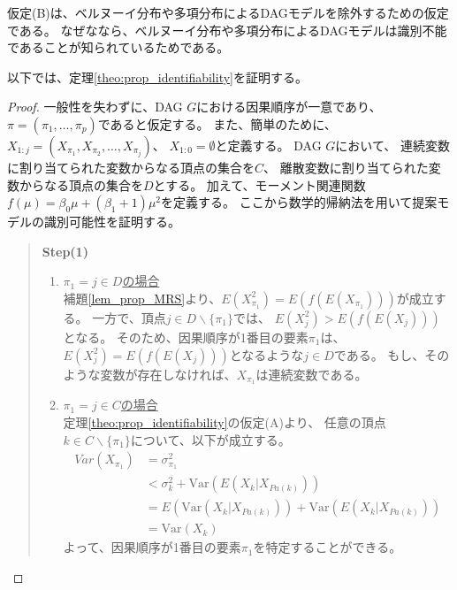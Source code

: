 仮定(B)は、ベルヌーイ分布や多項分布によるDAGモデルを除外するための仮定である。
なぜななら、ベルヌーイ分布や多項分布によるDAGモデルは識別不能であることが知られているためである\cite{Heckerman1995-es}。

以下では、定理\ref{theo:prop_identifiability}を証明する。

\begin{proof}
  一般性を失わずに、DAG $G$における因果順序が一意であり、$\pi = (\pi_1, \dots, \pi_p)$であると仮定する。
  また、簡単のために、$X_{1:j} = (X_{\pi_1}, X_{\pi_2}, \dots, X_{\pi_j})$、
  $X_{1:0} = \emptyset$と定義する。
  DAG $G$において、
  連続変数に割り当てられた変数からなる頂点の集合を$C$、
  離散変数に割り当てられた変数からなる頂点の集合を$D$とする。
  加えて、モーメント関連関数$f(\mu) = \beta_0 \mu + (\beta_1 + 1)\mu^2$を定義する。
  ここから数学的帰納法を用いて提案モデルの識別可能性を証明する。

  \begin{quote}
    \textbf{Step(1)}
    \begin{enumerate}[label=(\roman*)]
      \item
      \underline{$\pi_1 = j \in D$の場合} \\
      補題\ref{lem_prop_MRS}より、$E(X_{\pi_1}^2) = E(f(E(X_{\pi_1})))$が成立する。
      一方で、頂点$j \in D \backslash \{\pi_1\}$では、
      $E(X_j^2) > E(f(E(X_j)))$となる。
      そのため、因果順序が1番目の要素$\pi_1$は、
      $E(X_j^2) = E(f(E(X_j)))$となるような$j \in D$である。
      もし、そのような変数が存在しなければ、$X_{\pi_1}$は連続変数である。

      \item
      \underline{$\pi_1 = j \in C$の場合}\\
      定理\ref{theo:prop_identifiability}の仮定(A)より、
      任意の頂点$k \in C \backslash \{\pi_1\}$について、以下が成立する。
      \begin{align*}
        \mathit{Var}(X_{\pi_1}) &= \sigma_{\pi_1}^2 \\
                                &< \sigma_k^2 + \mathrm{Var}(E(X_k | X_{Pa(k)})) \\
                                &= E(\mathrm{Var}(X_k | X_{Pa(k)})) + \mathrm{Var}(E(X_k | X_{Pa(k)})) \\
                                &= \mathrm{Var}(X_k)
      \end{align*}
      よって、因果順序が1番目の要素$\pi_1$を特定することができる。
    \end{enumerate}
  \end{quote}


\end{proof}
